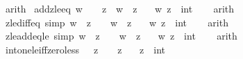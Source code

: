 \begin{isabellebody}
\endisadelimproof
%
\isatagproof
{}\isamarkupfalse%
\ arith%
\endisatagproof
{\isafoldproof}%
%
\isadelimproof
\isanewline
%
\endisadelimproof
\isanewline
{}\isamarkupfalse%
\ add{}{\isacharunderscore}{\kern0pt}zle{\isacharunderscore}{\kern0pt}eq{\isacharcolon}{\kern0pt}\ {\isachardoublequoteopen}w\ {\isacharplus}{\kern0pt}\ {}\ {\isasymle}\ z\ {\isasymlongleftrightarrow}\ w\ {\isacharless}{\kern0pt}\ z{\isachardoublequoteclose}\isanewline
\ \ \ w\ z\ {\isacharcolon}{\kern0pt}{\isacharcolon}{\kern0pt}\ int\isanewline
%
\isadelimproof
\ \ %
\endisadelimproof
%
\isatagproof
{}\isamarkupfalse%
\ arith%
\endisatagproof
{\isafoldproof}%
%
\isadelimproof
\isanewline
%
\endisadelimproof
\isanewline
{}\isamarkupfalse%
\ zle{\isacharunderscore}{\kern0pt}diff{}{\isacharunderscore}{\kern0pt}eq\ {\isacharbrackleft}{\kern0pt}simp{\isacharbrackright}{\kern0pt}{\isacharcolon}{\kern0pt}\ {\isachardoublequoteopen}w\ {\isasymle}\ z\ {\isacharminus}{\kern0pt}\ {}\ {\isasymlongleftrightarrow}\ w\ {\isacharless}{\kern0pt}\ z{\isachardoublequoteclose}\isanewline
\ \ \ w\ z\ {\isacharcolon}{\kern0pt}{\isacharcolon}{\kern0pt}\ int\isanewline
%
\isadelimproof
\ \ %
\endisadelimproof
%
\isatagproof
{}\isamarkupfalse%
\ arith%
\endisatagproof
{\isafoldproof}%
%
\isadelimproof
\isanewline
%
\endisadelimproof
\isanewline
{}\isamarkupfalse%
\ zle{\isacharunderscore}{\kern0pt}add{}{\isacharunderscore}{\kern0pt}eq{\isacharunderscore}{\kern0pt}le\ {\isacharbrackleft}{\kern0pt}simp{\isacharbrackright}{\kern0pt}{\isacharcolon}{\kern0pt}\ {\isachardoublequoteopen}w\ {\isacharless}{\kern0pt}\ z\ {\isacharplus}{\kern0pt}\ {}\ {\isasymlongleftrightarrow}\ w\ {\isasymle}\ z{\isachardoublequoteclose}\isanewline
\ \ \ w\ z\ {\isacharcolon}{\kern0pt}{\isacharcolon}{\kern0pt}\ int\isanewline
%
\isadelimproof
\ \ %
\endisadelimproof
%
\isatagproof
{}\isamarkupfalse%
\ arith%
\endisatagproof
{\isafoldproof}%
%
\isadelimproof
\isanewline
%
\endisadelimproof
\isanewline
{}\isamarkupfalse%
\ int{\isacharunderscore}{\kern0pt}one{\isacharunderscore}{\kern0pt}le{\isacharunderscore}{\kern0pt}iff{\isacharunderscore}{\kern0pt}zero{\isacharunderscore}{\kern0pt}less{\isacharcolon}{\kern0pt}\ {\isachardoublequoteopen}{}\ {\isasymle}\ z\ {\isasymlongleftrightarrow}\ {}\ {\isacharless}{\kern0pt}\ z{\isachardoublequoteclose}\isanewline
\ \ \ z\ {\isacharcolon}{\kern0pt}{\isacharcolon}{\kern0pt}\ int\isanewline

\end{isabellebody}
